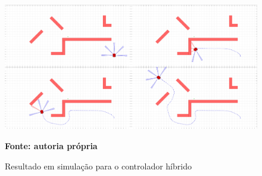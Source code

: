 \begin{figure}[ht]
\centering
\caption{Resultado em simulação para o controlador híbrido}
\label{fig:resultadoSimulacaoHibrido}
		\centering
		\includegraphics[clip, 
scale=0.232]{Figuras/simulacao_hibrido2Compactado}
		
	\textbf{Fonte: autoria própria}
\end{figure}